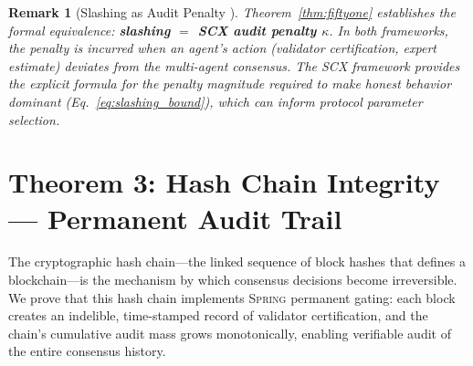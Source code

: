 \documentclass[11pt,a4paper]{article}
\newtheorem{remark}[theorem]{Remark}
\theoremstyle{definition}
\newcommand{\Spring}{\textsc{Spring}}
\newcommand{\SCX}{\textsc{SCX}}
\newcommand{\PoS}{\mathrm{PoS}}
\begin{document}
\begin{remark}[Slashing as Audit Penalty ]
\label{rem:slashing_audit}
Theorem~\ref{thm:fiftyone} establishes the formal equivalence: \textbf{\PoS{} slashing $=$ \SCX{} audit penalty $\kappa$}. In both frameworks, the penalty is incurred when an agent's action (validator certification, expert estimate) deviates from the multi-agent consensus. The \SCX{} framework provides the explicit formula for the penalty magnitude required to make honest behavior dominant (Eq.~\ref{eq:slashing_bound}), which can inform \PoS{} protocol parameter selection.
\end{remark}
\section{Theorem 3: Hash Chain Integrity — Permanent Audit Trail}
\label{sec:hashchain}
The cryptographic hash chain—the linked sequence of block hashes that defines a blockchain—is the mechanism by which consensus decisions become irreversible. We prove that this hash chain implements \Spring{} permanent gating: each block creates an indelible, time-stamped record of validator certification, and the chain's cumulative audit mass grows monotonically, enabling verifiable audit of the entire consensus history.
\end{document}
